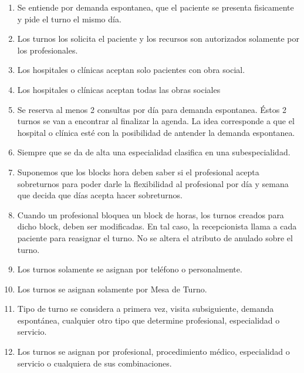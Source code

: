 \documentclass[a4paper,11pt]{article}
\begin{document}
\begin{enumerate}

    \item Se entiende por demanda espontanea, que el paciente se presenta 
    fisicamente y pide el turno el mismo día.
    
    \item Los turnos los solicita el paciente y los recursos son autorizados 
    solamente por los profesionales.

 \item Los hospitales o clínicas aceptan solo pacientes con obra social.
    
    \item Los hospitales o clínicas aceptan todas las obras sociales 
    
    \item Se reserva al menos 2 consultas por día para demanda espontanea.
    Éstos 2 turnos se van a encontrar al finalizar la agenda. La idea corresponde
    a que el hospital o clínica esté con la posibilidad de antender la demanda
    espontanea.
    
    \item Siempre que se da de alta una especialidad clasifica en una subespecialidad.
    
    \item Suponemos que los blocks hora deben saber si el profesional acepta 
    sobreturnos para poder darle la flexibilidad al profesional por día y semana 
    que decida que días acepta hacer sobreturnos.
    
    \item Cuando un profesional bloquea un block de horas, los turnos creados 
    para dicho block, deben ser modificadas. En tal caso, la recepcionista llama
    a cada paciente para reasignar el turno. No se altera el atributo de anulado 
    sobre el turno.
    
    \item Los turnos solamente se asignan por teléfono o personalmente.
    
    \item Los turnos se asignan solamente por Mesa de Turno.
    
    \item Tipo de turno se considera a primera vez, visita subsiguiente, demanda 
    espontánea, cualquier otro 
    tipo que determine profesional, especialidad o servicio.
    
    \item Los turnos se asignan por profesional, procedimiento médico, especialidad
    o servicio o cualquiera de sus combinaciones.
    

\end{enumerate}
\end{document}
